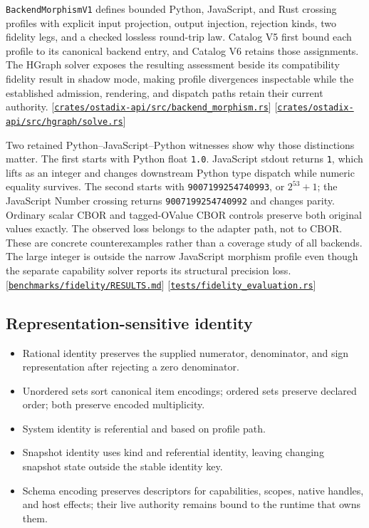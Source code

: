 \documentclass[11pt,oneside]{article}
\newcommand{\src}[1]{\textcolor{OSlate}{\scriptsize[\href{https://github.com/lostadi/OSTADIX/blob/c0b02c326b2329a95ba52447c7180bc93957cd57/#1}{\nolinkurl{#1}}]}\allowbreak}
\begin{document}
\texttt{BackendMorphismV1} defines bounded Python, JavaScript, and Rust
crossing profiles with explicit input projection, output injection, rejection
kinds, two fidelity legs, and a checked lossless round-trip law. Catalog V5
first bound each profile to its canonical backend entry, and Catalog V6 retains
those assignments. The HGraph solver exposes
the resulting assessment beside its compatibility fidelity result in shadow
mode, making profile divergences inspectable while the established admission,
rendering, and dispatch paths retain their current authority.
\src{crates/ostadix-api/src/backend_morphism.rs}
\src{crates/ostadix-api/src/hgraph/solve.rs}

Two retained Python--JavaScript--Python witnesses show why those distinctions
matter. The first starts with Python float \texttt{1.0}. JavaScript stdout
returns \texttt{1}, which lifts as an integer and changes downstream Python
type dispatch while numeric equality survives. The second starts with
\texttt{9007199254740993}, or $2^{53}+1$; the JavaScript Number crossing
returns \texttt{9007199254740992} and changes parity. Ordinary scalar CBOR and
tagged-OValue CBOR controls preserve both original values exactly. The
observed loss belongs to the adapter path, not to CBOR. These are concrete
counterexamples rather than a coverage study of all backends. The large
integer is outside the narrow JavaScript morphism profile even though the
separate capability solver reports its structural precision loss.
\src{benchmarks/fidelity/RESULTS.md}
\src{tests/fidelity_evaluation.rs}

\subsection{Representation-sensitive identity}

\begin{itemize}
  \item Rational identity preserves the supplied numerator, denominator, and
        sign representation after rejecting a zero denominator.
  \item Unordered sets sort canonical item encodings; ordered sets preserve
        declared order; both preserve encoded multiplicity.
  \item System identity is referential and based on profile path.
  \item Snapshot identity uses kind and referential identity, leaving changing
        snapshot state outside the stable identity key.
  \item Schema encoding preserves descriptors for capabilities, scopes,
        native handles, and host effects; their live authority remains bound
        to the runtime that owns them.
\end{itemize}
\end{document}
